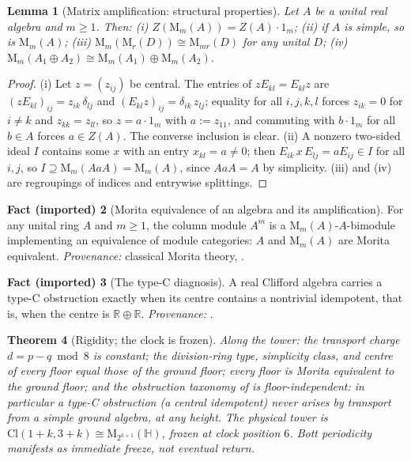 \documentclass[11pt]{article}
\newtheorem{theorem}{Theorem}[section]
\newtheorem{lemma}[theorem]{Lemma}
\theoremstyle{definition}
\newtheorem{fact}[theorem]{Fact (imported)}
\newcommand{\Cl}{\mathrm{Cl}}
\newcommand{\R}{\mathbb{R}}
\newcommand{\HH}{\mathbb{H}}
\newcommand{\Mat}{\mathrm{M}}
\begin{document}
\begin{lemma}[Matrix amplification: structural properties]\label{lem:amplification}
Let $A$ be a unital real algebra and $m \geq 1$. Then: (i) $Z(\Mat_m(A)) = Z(A)\cdot 1_m$; (ii) if $A$ is simple, so is $\Mat_m(A)$; (iii) $\Mat_m(\Mat_r(D)) \cong \Mat_{mr}(D)$ for any unital $D$; (iv) $\Mat_m(A_1 \oplus A_2) \cong \Mat_m(A_1) \oplus \Mat_m(A_2)$.
\end{lemma}

\begin{proof}
(i) Let $z = (z_{ij})$ be central. The entries of $z E_{kl} = E_{kl} z$ are $(z E_{kl})_{ij} = z_{ik}\,\delta_{lj}$ and $(E_{kl} z)_{ij} = \delta_{ik}\, z_{lj}$; equality for all $i, j, k, l$ forces $z_{ik} = 0$ for $i \neq k$ and $z_{kk} = z_{ll}$, so $z = a \cdot 1_m$ with $a := z_{11}$, and commuting with $b \cdot 1_m$ for all $b \in A$ forces $a \in Z(A)$. The converse inclusion is clear. (ii) A nonzero two-sided ideal $I$ contains some $x$ with an entry $x_{kl} = a \neq 0$; then $E_{ik}\, x\, E_{lj} = a E_{ij} \in I$ for all $i, j$, so $I \supseteq \Mat_m(AaA) = \Mat_m(A)$, since $AaA = A$ by simplicity. (iii) and (iv) are regroupings of indices and entrywise splittings.
\end{proof}

\begin{fact}[Morita equivalence of an algebra and its amplification]\label{fact:morita}
For any unital ring $A$ and $m \geq 1$, the column module $A^m$ is a $\Mat_m(A)$-$A$-bimodule implementing an equivalence of module categories: $A$ and $\Mat_m(A)$ are Morita equivalent. \emph{Provenance:} classical Morita theory, \cite[\S\S 17--18]{Lam1999}.
\end{fact}

\begin{fact}[The type-C diagnosis]\label{fact:typeC}
A real Clifford algebra carries a type-C obstruction exactly when its centre contains a nontrivial idempotent, that is, when the centre is $\R \oplus \R$. \emph{Provenance:} \cite[Thm.~3.6]{ButlerT1}.
\end{fact}

\begin{theorem}[Rigidity; the clock is frozen]\label{thm:rigidity}
Along the tower: the transport charge $d = p - q \bmod 8$ is constant; the division-ring type, simplicity class, and centre of every floor equal those of the ground floor; every floor is Morita equivalent to the ground floor; and the obstruction taxonomy of \cite{ButlerT1} is floor-independent: in particular a type-C obstruction (a central idempotent) never arises by transport from a simple ground algebra, at any height. The physical tower is $\Cl(1{+}k, 3{+}k) \cong \Mat_{2^{k+1}}(\HH)$, frozen at clock position $6$. Bott periodicity manifests as immediate freeze, not eventual return.
\end{theorem}
\end{document}
